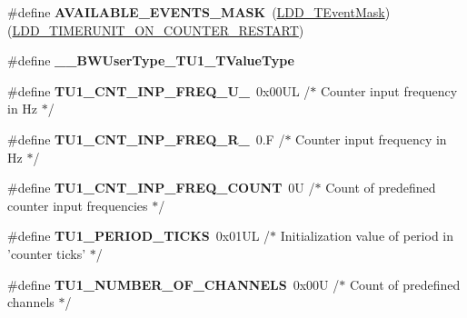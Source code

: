 \begin{DoxyCompactItemize}
\item 
\hypertarget{group___t_u1__module_ga5f04a8830cd52a3ffa1678d113f31aee}{\#define {\bfseries A\-V\-A\-I\-L\-A\-B\-L\-E\-\_\-\-E\-V\-E\-N\-T\-S\-\_\-\-M\-A\-S\-K}~(\hyperlink{group___p_e___types__module_gafbe7f4d4e51560399c3bdd0218584533}{L\-D\-D\-\_\-\-T\-Event\-Mask})(\hyperlink{group___p_e___types__module_gae8e6bf9d76916611a08b76f20ceb1ef7}{L\-D\-D\-\_\-\-T\-I\-M\-E\-R\-U\-N\-I\-T\-\_\-\-O\-N\-\_\-\-C\-O\-U\-N\-T\-E\-R\-\_\-\-R\-E\-S\-T\-A\-R\-T})}\label{group___t_u1__module_ga5f04a8830cd52a3ffa1678d113f31aee}

\item 
\hypertarget{group___t_u1__module_gaf0b58bf613a080724fc73a1d8b13ff39}{\#define {\bfseries \-\_\-\-\_\-\-B\-W\-User\-Type\-\_\-\-T\-U1\-\_\-\-T\-Value\-Type}}\label{group___t_u1__module_gaf0b58bf613a080724fc73a1d8b13ff39}

\item 
\hypertarget{group___t_u1__module_ga85cc4897457440a2308166668f49da10}{\#define {\bfseries T\-U1\-\_\-\-C\-N\-T\-\_\-\-I\-N\-P\-\_\-\-F\-R\-E\-Q\-\_\-\-U\-\_}~0x00\-U\-L    /$\ast$ Counter input frequency in Hz $\ast$/}\label{group___t_u1__module_ga85cc4897457440a2308166668f49da10}

\item 
\hypertarget{group___t_u1__module_ga4913c95039859613c2db9d00795ab5d6}{\#define {\bfseries T\-U1\-\_\-\-C\-N\-T\-\_\-\-I\-N\-P\-\_\-\-F\-R\-E\-Q\-\_\-\-R\-\_}~0.\-F      /$\ast$ Counter input frequency in Hz $\ast$/}\label{group___t_u1__module_ga4913c95039859613c2db9d00795ab5d6}

\item 
\hypertarget{group___t_u1__module_ga855f7e71146b18903d56643ec80c5ddb}{\#define {\bfseries T\-U1\-\_\-\-C\-N\-T\-\_\-\-I\-N\-P\-\_\-\-F\-R\-E\-Q\-\_\-\-C\-O\-U\-N\-T}~0\-U      /$\ast$ Count of predefined counter input frequencies $\ast$/}\label{group___t_u1__module_ga855f7e71146b18903d56643ec80c5ddb}

\item 
\hypertarget{group___t_u1__module_ga17e6ec4b6bb1df9067daf9ac4204db66}{\#define {\bfseries T\-U1\-\_\-\-P\-E\-R\-I\-O\-D\-\_\-\-T\-I\-C\-K\-S}~0x01\-U\-L      /$\ast$ Initialization value of period in 'counter ticks' $\ast$/}\label{group___t_u1__module_ga17e6ec4b6bb1df9067daf9ac4204db66}

\item 
\hypertarget{group___t_u1__module_ga15dbabf955f2e2b0f888b98320eabfa3}{\#define {\bfseries T\-U1\-\_\-\-N\-U\-M\-B\-E\-R\-\_\-\-O\-F\-\_\-\-C\-H\-A\-N\-N\-E\-L\-S}~0x00\-U   /$\ast$ Count of predefined channels $\ast$/}\label{group___t_u1__module_ga15dbabf955f2e2b0f888b98320eabfa3}


\end{DoxyCompactItemize}
